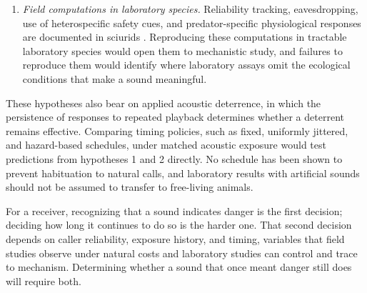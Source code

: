 \begin{enumerate}[leftmargin=*, label=(\arabic*)]
  \item \textit{Field computations in laboratory species.} Reliability tracking, eavesdropping, use of heterospecific safety cues, and predator-specific physiological responses are documented in sciurids \citep{HareAtkins2001,GetschowEtAl2013,LillyEtAl2019,Mateo2010}. Reproducing these computations in tractable laboratory species would open them to mechanistic study, and failures to reproduce them would identify where laboratory assays omit the ecological conditions that make a sound meaningful.
\end{enumerate}

These hypotheses also bear on applied acoustic deterrence, in which the persistence of responses to repeated playback determines whether a deterrent remains effective. Comparing timing policies, such as fixed, uniformly jittered, and hazard-based schedules, under matched acoustic exposure would test predictions from hypotheses 1 and 2 directly. No schedule has been shown to prevent habituation to natural calls, and laboratory results with artificial sounds should not be assumed to transfer to free-living animals.

For a receiver, recognizing that a sound indicates danger is the first decision; deciding how long it continues to do so is the harder one. That second decision depends on caller reliability, exposure history, and timing, variables that field studies observe under natural costs and laboratory studies can control and trace to mechanism. Determining whether a sound that once meant danger still does will require both.
